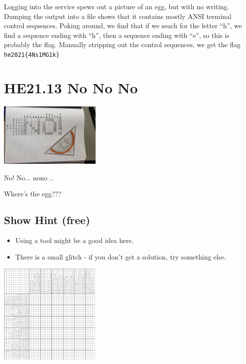 \documentclass[english,a4paper,nols,noindent]{tufte-handout}
\begin{document}
Logging into the service spews out a picture of an egg, but with no
writing.  Dumping the output into a file shows that it contains mostly
ANSI terminal control sequences.  Poking around, we find that if we
seach for the letter ``h'', we find a sequence ending with ``h'', then
a sequence ending with ``e'', so this is probably the flag.  Manually
stripping out the control sequences, we get the flag
\verb+he2021{4Ns1MG1k}+


\hypertarget{he21.13}{%
  \section{HE21.13 No No No}
  \label{he21.13}}
\begin{marginfigure}
    \includegraphics[width=50mm]{images/challenge13.jpg}
\end{marginfigure}

\noindent No! No... nono ..

Where's the egg???

\subsection{Show Hint (free)}
\begin{itemize}
\item Using a tool might be a good idea here.
\item There is a small glitch - if you don't get a solution, try something else.
\end{itemize}

\begin{marginfigure}
    \includegraphics[width=50mm]{ch13/nonobunnygram.png}
\end{marginfigure}
\end{document}
